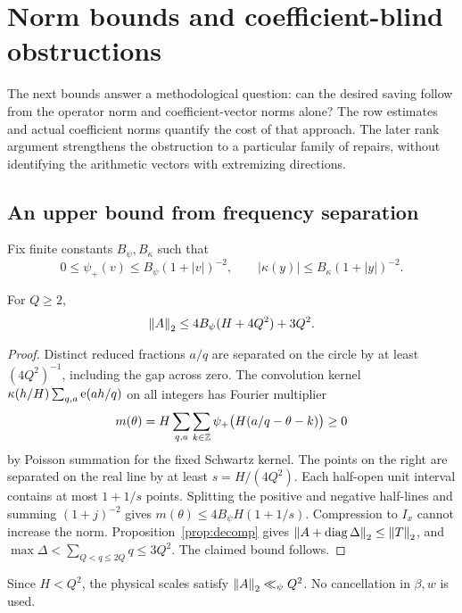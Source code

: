 \section{Norm bounds and coefficient-blind obstructions}\label{sec:barriers}
The next bounds answer a methodological question: can the desired saving follow from the operator norm and coefficient-vector norms alone? The row estimates and actual coefficient norms quantify the cost of that approach. The later rank argument strengthens the obstruction to a particular family of repairs, without identifying the arithmetic vectors with extremizing directions.
\subsection{An upper bound from frequency separation}
Fix finite constants $B_\psi,B_\kappa$ such that
\[
0\le\psi_+(v)\le B_\psi(1+|v|)^{-2},\qquad
|\kappa(y)|\le B_\kappa(1+|y|)^{-2}.
\]
\begin{lemma}\label{lem:upper}
For $Q\ge2$,
\[
\left\|A\right\|_2\le4B_\psi(H+4Q^2)+3Q^2.
\]
\end{lemma}
\begin{proof}
Distinct reduced fractions $a/q$ are separated on the circle by at least $(4Q^2)^{-1}$, including the gap across zero. The convolution kernel
$\kappa(h/H)\sum_{q,a}\mathrm e(ah/q)$ on all integers has Fourier multiplier
\[
m(\theta)=H\sum_{q,a}\sum_{k\in\mathbb Z}\psi_+\big(H(a/q-\theta-k)\big)\ge0
\]
by Poisson summation for the fixed Schwartz kernel. The points on the right are separated on the real line by at least $s=H/(4Q^2)$. Each half-open unit interval contains at most $1+1/s$ points. Splitting the positive and negative half-lines and summing $(1+j)^{-2}$ gives
$m(\theta)\le4B_\psi H(1+1/s)$.
Compression to $I_x$ cannot increase the norm. Proposition~\ref{prop:decomp} gives $\left\|A+\operatorname{diag}\Delta\right\|_2\le\left\|T\right\|_2$, and
$\max\Delta<\sum_{Q<q\le2Q}q\le3Q^2$. The claimed bound follows.
\end{proof}
Since $H<Q^2$, the physical scales satisfy $\left\|A\right\|_2\ll_\psi Q^2$. No cancellation in $\beta,w$ is used.


